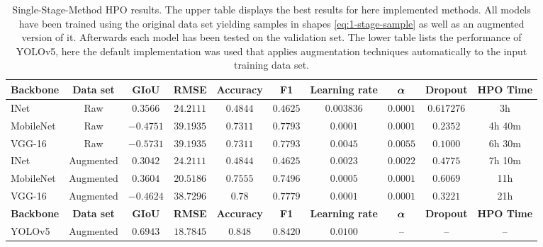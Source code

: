 \begin{landscape}
\begin{table}[!ht]
    \centering
    \begin{tabular}{|l|c|c|c|c|c|c|c|c|c|}
    \hline
        \textbf{Backbone} & \textbf{Data set} & \textbf{GIoU} & \textbf{RMSE} & \textbf{Accuracy} & \textbf{F1} & \textbf{Learning rate} & $\bm{\alpha}$ & \textbf{Dropout} & \textbf{HPO Time}  \\
        \hline
        INet & Raw& $0.3566$ &
$24.2111$ & $0.4844$ & $0.4625$ & $0.003836$ & $0.0001$ & $0.617276$ & 3h \\
        \hline
        MobileNet &Raw& $-0.4751$ & $39.1935$ & $0.7311$ & $0.7793$ & $0.0001$ & $0.0001$ & $0.2352$ & 4h 40m\\
        \hline
        VGG-16 &Raw& $-0.5731$
& $39.1935$ & $0.7311$ & $0.7793$ & $0.0045$ & $0.0055$ & $0.1000$ & 6h 30m \\
        \hline
        \hline
        INet & Augmented& $0.3042$ &
$24.2111$ & $0.4844$ & $0.4625$ & $0.0023$ & $0.0022$ & $0.4775$ & 7h 10m\\
        \hline
        MobileNet &Augmented& $0.3604$ & $20.5186$ & $0.7555$ & $0.7496$ & $0.0005$ & $0.0001$ & $0.6069$ & 11h\\
        \hline
        VGG-16 &Augmented& $-0.4624$
& $38.7296$ & $0.78$ & $0.7779$ & $0.0001$ & $0.0001$ & $0.3221$ & 21h \\
        \hline
        \hline
        \textbf{Backbone} & \textbf{Data set} & \textbf{GIoU} & \textbf{RMSE} & \textbf{Accuracy} & \textbf{F1} & \textbf{Learning rate} & $\bm{\alpha}$ & \textbf{Dropout} & \textbf{HPO Time}  \\
        \hline
        YOLOv5 & Augmented & $0.6943$ & $18.7845$ & $0.848$ & $0.8420$ & $0.0100$ & – & – & – \\
        \hline
    \end{tabular}
    \caption{Single-Stage-Method HPO results. The upper table displays the best results for here implemented methods.
    All models have been trained using the original data set yielding samples in shapes \eqref{eq:1-stage-sample} as well as an augmented version of it.
    Afterwards each model has been tested on the validation set.
    The lower table lists the performance of YOLOv5, here the default implementation was used that applies augmentation techniques automatically to the input training data set.}
    \label{fig:single-stage-results}
\end{table}
\end{landscape}

